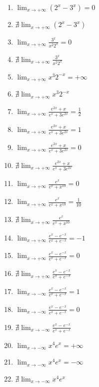 \documentclass[11pt,a4paper]{article}
\begin{document}
\begin{enumerate}
\item $\displaystyle \lim_{x \to +\infty} \left(2^{x} - 3^{x}\right) = 0$
\item $\displaystyle \nexists \lim_{x \to +\infty} \left(2^{x} - 3^{x}\right)$
\item $\displaystyle \lim_{x \to +\infty} \frac{3^{x}}{x^{2} 2^{x}} = 0$
\item $\displaystyle \nexists \lim_{x \to +\infty} \frac{3^{x}}{x^{2} 2^{x}}$
\item $\displaystyle \lim_{x \to +\infty} x^{3} 2^{-x} = +\infty$
\item $\displaystyle \nexists \lim_{x \to +\infty} x^{3} 2^{-x}$
\item $\displaystyle \lim_{x \to +\infty} \frac{e^{2x} + x}{e^{x} + 3e^{2x}} = \frac{1}{2}$
\item $\displaystyle \lim_{x \to +\infty} \frac{e^{2x} + x}{e^{x} + 3e^{2x}} = 1$
\item $\displaystyle \lim_{x \to +\infty} \frac{e^{2x} + x}{e^{x} + 3e^{2x}} = 0$
\item $\displaystyle \nexists \lim_{x \to +\infty} \frac{e^{2x} + x}{e^{x} + 3e^{2x}}$
\item $\displaystyle \lim_{x \to +\infty} \frac{e^{x}}{e^{x} + x^{10}} = 0$
\item $\displaystyle \lim_{x \to +\infty} \frac{e^{x}}{e^{x} + x^{10}} = \frac{1}{10}$
\item $\displaystyle \nexists \lim_{x \to +\infty} \frac{e^{x}}{e^{x} + x^{10}}$
\item $\displaystyle \lim_{x \to +\infty} \frac{e^{x} - e^{-x}}{e^{x} + e^{-x}} = -1$
\item $\displaystyle \lim_{x \to +\infty} \frac{e^{x} - e^{-x}}{e^{x} + e^{-x}} = 0$
\item $\displaystyle \nexists \lim_{x \to +\infty} \frac{e^{x} - e^{-x}}{e^{x} + e^{-x}}$
\item $\displaystyle \lim_{x \to -\infty} \frac{e^{x} - e^{-x}}{e^{x} + e^{-x}} = 1$
\item $\displaystyle \lim_{x \to -\infty} \frac{e^{x} - e^{-x}}{e^{x} + e^{-x}} = 0$
\item $\displaystyle \nexists \lim_{x \to -\infty} \frac{e^{x} - e^{-x}}{e^{x} + e^{-x}}$
\item $\displaystyle \lim_{x \to -\infty} x^{4} e^{x} = +\infty$
\item $\displaystyle \lim_{x \to -\infty} x^{4} e^{x} = -\infty$
\item $\displaystyle \nexists \lim_{x \to -\infty} x^{4} e^{x}$

\end{enumerate}
\end{document}
